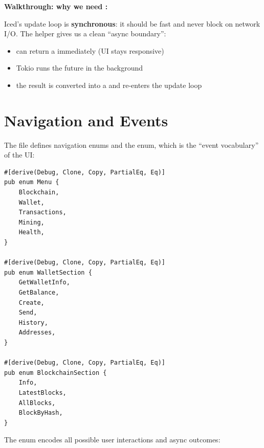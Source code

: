 \textbf{Walkthrough: why we need :}

Iced's update loop is \textbf{synchronous}: it should be fast and never block on network I/O. The  helper gives us a clean ``async boundary'':

\begin{itemize}
  \item {} can return a  immediately (UI stays responsive)
  \item Tokio runs the future in the background
  \item the result is converted into a  and re-enters the update loop
\end{itemize}

\section{Navigation and Events}
\label{sec:ch16-types}

The  file defines navigation enums and the  enum, which is the ``event vocabulary'' of the UI:

\begin{listing}[htbp]
\caption{Navigation enums ()}
\label{lst:ch16-menu-enum}
\begin{verbatim}
#[derive(Debug, Clone, Copy, PartialEq, Eq)]
pub enum Menu {
    Blockchain,
    Wallet,
    Transactions,
    Mining,
    Health,
}

#[derive(Debug, Clone, Copy, PartialEq, Eq)]
pub enum WalletSection {
    GetWalletInfo,
    GetBalance,
    Create,
    Send,
    History,
    Addresses,
}

#[derive(Debug, Clone, Copy, PartialEq, Eq)]
pub enum BlockchainSection {
    Info,
    LatestBlocks,
    AllBlocks,
    BlockByHash,
}
\end{verbatim}
\end{listing}

The  enum encodes all possible user interactions and async outcomes:

